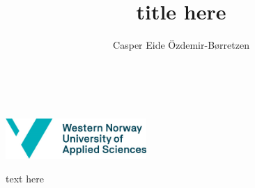 \documentclass[11pt,a4paper]{report}
\title{title here}
\author{Casper Eide Özdemir-Børretzen}
\date{}
\makeatletter
\newcommand{\institle}{\@title}
\newcommand{\insauthor}{\@author}
\makeatother
\begin{document}
%
\begin{titlepage}
\begin{center}
\vspace*{6cm}
\LARGE{\institle}\\
\vspace{1cm}
\large{\insauthor}\\
\vfill
\includegraphics[width=0.4\textwidth]{hvl_logo_engelsk.png}\\
\end{center}
\end{titlepage}

\newpage

text here
\end{document}
